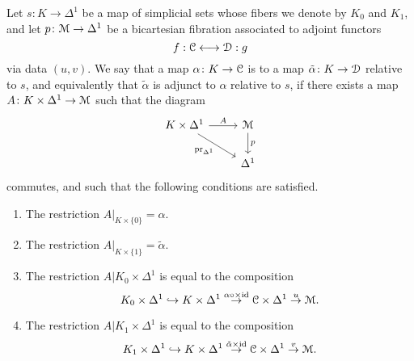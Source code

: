 \documentclass[main.tex]{subfiles}
\begin{document}
\begin{definition}
  \label{def:adjunct_data}
  Let $s\colon K \to \Delta^{1}$ be a map of simplicial sets whose fibers we denote by $K_{0}$ and $K_{1}$, and let $p\colon \mathcal{M} \to \Delta^{1}$ be a bicartesian fibration associated to adjoint functors
  \begin{equation*}
    f : \mathcal{C} \longleftrightarrow \mathcal{D} : g
  \end{equation*}
  via data $(u, v)$. We say that a map $\alpha\colon K \to \mathcal{C}$ is  to a map $\tilde{\alpha}\colon K \to \mathcal{D}$ relative to $s$, and equivalently that $\tilde{\alpha}$ is adjunct to $\alpha$ relative to $s$, if there exists a map $A\colon K \times \Delta^{1} \to \mathcal{M}$ such that the diagram
  \begin{equation*}
    \begin{tikzcd}
      K \times \Delta^{1}
      \arrow[r, "A"]
      \arrow[dr, swap, "\pr_{\Delta^{1}}"]
      & \category{M}
      \arrow[d, "p"]
      \\
      & \Delta^{1}
    \end{tikzcd}
  \end{equation*}
  commutes, and such that the following conditions are satisfied.
  \begin{enumerate}
    \item The restriction $A|_{K \times \{0\}} = \alpha$.

    \item The restriction $A|_{K \times \{1\}} = \tilde{\alpha}$.

    \item The restriction $A|K_{0} \times \Delta^{1}$ is equal to the composition
      \begin{equation*}
        K_{0} \times \Delta^{1} \hookrightarrow K \times \Delta^{1} \overset{\alpha \circ \times \mathrm{id}}{\to} \mathcal{C} \times \Delta^{1} \overset{u}{\to} \mathcal{M}.
      \end{equation*}

    \item The restriction $A|K_{1} \times \Delta^{1}$ is equal to the composition
      \begin{equation*}
        K_{1} \times \Delta^{1} \hookrightarrow K \times \Delta^{1} \overset{\tilde{\alpha} \times \mathrm{id}}{\to} \mathcal{C} \times \Delta^{1} \overset{v}{\to} \mathcal{M}.
      \end{equation*}
  \end{enumerate}
\end{definition}
\end{document}
